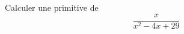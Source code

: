 Calculer une primitive de
\begin{displaymath}
 \frac{x}{x^2-4x+29}
\end{displaymath}
\bigskip \bigskip \bigskip